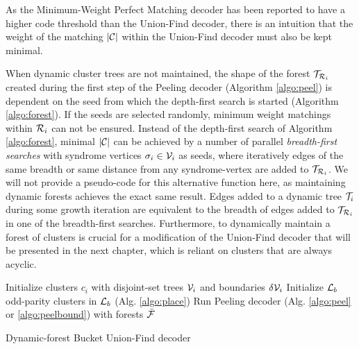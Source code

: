 \begin{proposition}\label{prop:mw1}
  As the Minimum-Weight Perfect Matching decoder has been reported to have a higher code threshold than the Union-Find decoder, there is an intuition that the weight of the matching $|\mathcal{C}|$ within the Union-Find decoder must also be kept minimal. 
\end{proposition}
When dynamic cluster trees are not maintained, the shape of the forest $\mathcal{T}_{\mathcal{R}_i}$ created during the first step of the Peeling decoder (Algorithm \ref{algo:peel}) is dependent on the seed from which the depth-first search is started (Algorithm \ref{algo:forest}).  If the seeds are selected randomly, minimum weight matchings within $\mathcal{R}_i$ can not be ensured. Instead of the depth-first search of Algorithm \ref{algo:forest}, minimal $|\mathcal{C}|$ can be achieved by a number of parallel \emph{breadth-first searches} with syndrome vertices $\sigma_i \in \mathcal{V}_i$ as seeds, where iteratively edges of the same breadth or same distance from any syndrome-vertex are added to $\mathcal{T}_{\mathcal{R}_i}$. We will not provide a pseudo-code for this alternative  function here, as maintaining dynamic forests achieves the exact same result. Edges added to a dynamic tree $\mathcal{T}_i$ during some growth iteration are equivalent to the breadth of edges added to $\mathcal{T}_{\mathcal{R}_i}$ in one of the breadth-first searches. Furthermore, to dynamically maintain a forest of clusters is crucial for a modification of the Union-Find decoder that will be presented in the next chapter, which is reliant on clusters that are always acyclic. 

\begin{algorithm}[htb]
  \BlankLine
  \BlankLine
  Initialize clusters $c_i$ with disjoint-set trees $\mathcal{V}_i$ and boundaries $\delta \mathcal{V}_i$\;
  Initialize $\mathcal{L}_b$
   odd-parity clusters in $\mathcal{L}_b$ (Alg. \ref{algo:place})\;
  \BlankLine
  Run Peeling decoder (Alg. \ref{algo:peel} or \ref{algo:peelbound}) with forests $\bar{\mathcal{F}}$
  \BlankLine
  \caption{Dynamic-forest Bucket Union-Find decoder}\label{algo:dbuf}
\end{algorithm}

